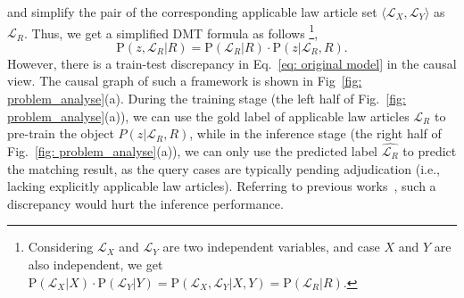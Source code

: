 and simplify the pair of the corresponding applicable law article set $\langle \mathcal{L}_X, \mathcal{L}_Y \rangle$ as $\mathcal{L}_R$.
Thus, we get a simplified DMT formula as follows
\footnote{Considering $\mathcal{L}_X$ and $\mathcal{L}_Y$ are two independent variables, and case $X$ and $Y$ are also independent, we get $\mathrm{P}(\mathcal{L}_X|X) \cdot \mathrm{P}(\mathcal{L}_Y|Y)=\mathrm{P}(\mathcal{L}_X, \mathcal{L}_Y|X, Y)=\mathrm{P}(\mathcal{L}_R|R)$.},
\begin{equation} \label{eq: original model}
    \mathrm{P}(z, \mathcal{L}_R|R) = \mathrm{P}(\mathcal{L}_R|R) \cdot \mathrm{P}(z|\mathcal{L}_R, R).
\end{equation}
However, there is a train-test discrepancy in Eq.~\ref{eq: original model} in the causal view. 
The causal graph of such a framework is shown in Fig~\ref{fig: problem_analyse}(a).
During the training stage (the left half of Fig.~\ref{fig: problem_analyse}(a)), we can use the gold label of applicable law articles $\mathcal{L}_R$ to pre-train the object $P(z|\mathcal{L}_R, R)$, while in the inference stage (the right half of Fig.~\ref{fig: problem_analyse}(a)), we can only use the predicted label $\hat{\mathcal{L}_R}$ to predict the matching result, as the query cases are typically pending adjudication (i.e., lacking explicitly applicable law articles).
Referring to previous works~\cite{chen2020Causal_1, chen2021Causal_2}, such a discrepancy would hurt the inference performance.

